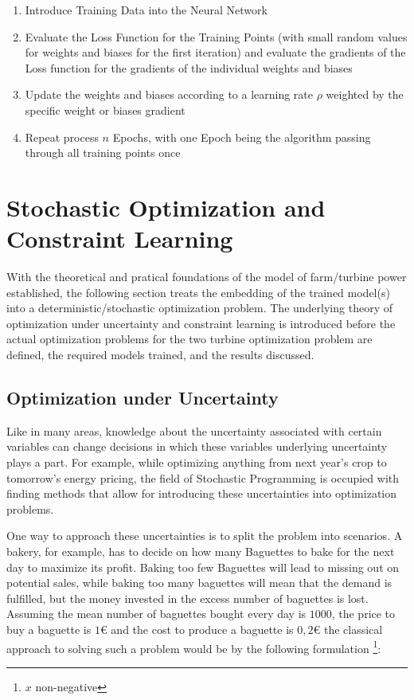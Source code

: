 \documentclass[preprint,12pt]{elsarticle}
\begin{document}
\begin{enumerate}
	\item Introduce Training Data into the Neural Network
	\item Evaluate the Loss Function for the Training Points (with small random values for weights and biases for the first iteration) and evaluate the gradients of the Loss function for the gradients of the individual weights and biases 
	\item Update the weights and biases according to a learning rate $\rho$ weighted by the specific weight or biases gradient
	\item Repeat process $n$ Epochs, with one Epoch being the algorithm passing through all training points once
\end{enumerate}



\section{Stochastic Optimization and Constraint Learning}\label{section:optimization}

With the theoretical and pratical foundations of the model of farm/turbine power established, the following section treats the embedding of the trained model(s)  into a deterministic/stochastic optimization problem. The underlying theory of optimization under uncertainty and constraint learning is introduced before the actual optimization problems for the two turbine optimization problem are defined, the required models trained, and the results discussed.


\subsection{Optimization under Uncertainty} \label{subsec:opti_under_uncertainty}

Like in many areas, knowledge about the uncertainty associated with certain variables can change decisions in which these variables underlying uncertainty plays a part. For example, while optimizing anything from next year's crop to tomorrow's energy pricing, the field of Stochastic Programming is occupied with finding methods that allow for introducing these uncertainties into optimization problems.

One way to approach these uncertainties is to split the problem into scenarios. A bakery, for example, has to decide on how many Baguettes to bake for the next day to maximize its profit. Baking too few Baguettes will lead to missing out on potential sales, while baking too many baguettes will mean that the demand is fulfilled, but the money invested in the excess number of baguettes is lost. Assuming the mean number of baguettes bought every day is $1000$, the price to buy a baguette is $1 €$ and the cost to produce a baguette is $0,2 €$ the classical approach to solving such a problem would be by the following formulation \footnote{$x$ non-negative}: 
\end{document}
